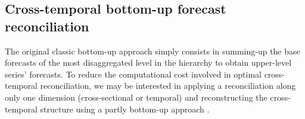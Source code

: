 \documentclass[a4paper,11pt]{article}
\theoremstyle{definition}
\begin{document}
\subsection{Cross-temporal bottom-up forecast reconciliation}\label{ssec:ctbu}

The original classic bottom-up approach \citep{dunn1976, dangerfield1992} simply consists in summing-up the base forecasts of the most disaggregated level in the hierarchy to obtain upper-level series’ forecasts. To reduce the computational cost involved in optimal cross-temporal reconciliation, we may be interested in applying a reconciliation along only one dimension (cross-sectional or temporal) and reconstructing the cross-temporal structure using a partly bottom-up approach \citep{difonzo2022b, difonzo2023a, sanguri2022}.

\begin{figure}[!b]
     \centering


\end{figure}
\end{document}
